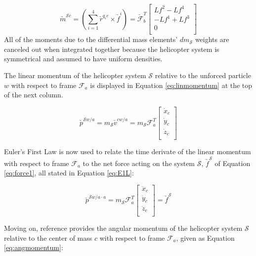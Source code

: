 \documentclass[journal]{IEEEtran}
\begin{document}
\begin{equation}
\underrightarrow{m}^{\mathcal{S}c}=(\sum_{i=1}^4\underrightarrow{r}^{q_ic}\times\underrightarrow{f}^i)=\underrightarrow{\mathcal{F}}^T_b\left[ \begin{array}{c}
				Lf^2-Lf^4 \\
				-Lf^1+Lf^3 \\
				0 \\
				\end{array} \right]
\label{eq:moments}
\end{equation}
All of the moments due to the differential mass elements' $dm_{\mathcal{S}}$ weights are canceled out when integrated together because the helicopter system is symmetrical and assumed to have uniform densities. 

The linear momentum of the helicopter system $\mathcal{S}$ relative to the unforced particle $w$ with respect to frame $\mathcal{F}_a$ is displayed in Equation \ref{eq:linmomentum} at the top of the next column.

\begin{equation}
\underrightarrow{p}^{\mathcal{S}w/a}=m_{\mathcal{S}}\underrightarrow{v}^{cw/a}=m_{\mathcal{S}}\mathcal{F}^T_a \left[ \begin{array}{c}
				\dot{x}_c \\
				\dot{y}_c \\
				\dot{z}_c \\
				\end{array} \right]
\label{eq:linmomentum}
\end{equation}

Euler's First Law is now used to relate the time derivate of the linear momentum with respect to frame $\mathcal{F}_a$ to the net force acting on the system $\mathcal{S}$, $\underrightarrow{f}^{\mathcal{S}}$ of Equation \ref{eq:force1}, all stated in Equation \ref{eq:E1L}:

\begin{equation}
\underrightarrow{p}^{\mathcal{S}w/a \cdot a}=m_{\mathcal{S}}\mathcal{F}^T_a \left[ \begin{array}{c}
				\ddot{x}_c \\
				\ddot{y}_c \\
				\ddot{z}_c \\
				\end{array} \right]=\underrightarrow{f}^{\mathcal{S}}
\label{eq:E1L}
\end{equation}

Moving on, reference \cite{dual_spin} provides the angular momentum of the helicopter system $\mathcal{S}$ relative to the center of mass $c$ with respect to frame $\mathcal{F}_a$, given as Equation \ref{eq:angmomentum}:
\end{document}
